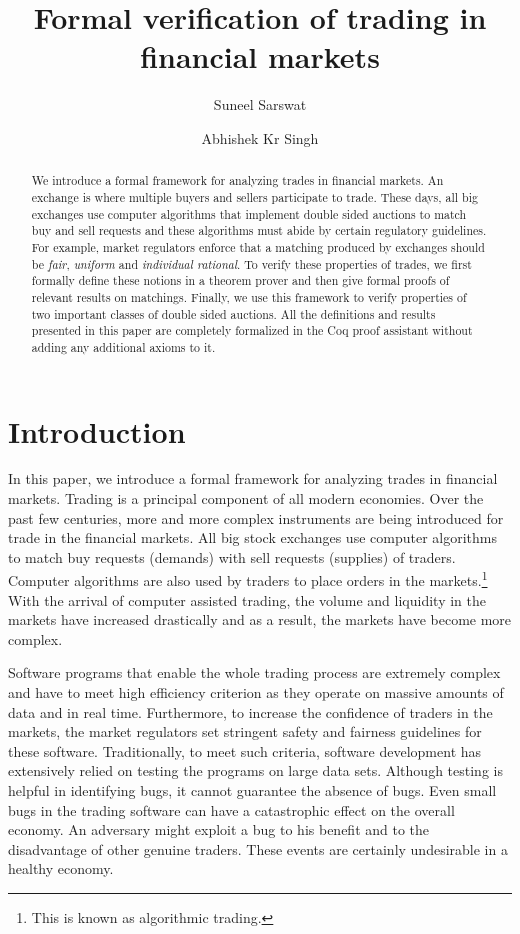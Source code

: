 \documentclass[a4paper,UKenglish,cleveref, autoref]{lipics-v2019}
\title{Formal verification of trading in financial markets} %
\author{Suneel Sarswat}{Tata Institute of Fundamental Research, India} {suneel.sarswat@gmail.com}
{}{}
\author{Abhishek Kr Singh}{Tata Institute of Fundamental Research, India} {abhishek.uor@gmail.com}
{}{}
\begin{document}
\newcommand{\tw}{\texttt}

\maketitle

\begin{abstract}


We introduce a formal framework for analyzing trades in financial markets. 
An exchange is where multiple buyers and sellers participate to trade.
These days, all big exchanges use computer algorithms that implement double sided auctions to match buy and sell requests and these algorithms must 
abide by certain regulatory guidelines.
For example, market regulators enforce that a matching produced by exchanges should 
be \emph{fair}, \emph{uniform} and \emph{individual rational}. 
To verify these properties of trades, we first formally define these notions
in a theorem prover and then give formal proofs of relevant results on matchings.
Finally, we use this framework to verify properties of two important classes of double
sided auctions. All the definitions and results presented in this paper are completely formalized in
the Coq proof assistant without adding any additional axioms to it. 


\end{abstract}

\section{Introduction}
\label{section1}

In this paper, we introduce a formal framework for analyzing trades in financial markets. Trading is a principal component of all modern economies. Over the past few centuries, more and more complex instruments are being introduced for trade in the financial markets. All big stock exchanges use computer algorithms to match buy requests (demands) with sell requests (supplies) of traders. Computer algorithms are also used by  traders to place orders in the markets.\footnote{This is known as algorithmic trading.} With the arrival of computer assisted trading, the volume and liquidity in the markets have increased drastically and as a result, the markets have become more complex.

Software programs that enable the whole trading process are extremely complex and have to meet high efficiency criterion as they operate on massive amounts of data and in real time. Furthermore, to increase the confidence of traders in the markets, the market regulators set stringent safety and fairness guidelines for these software. Traditionally, to meet such criteria, software development has extensively relied on testing the programs on large data sets. Although testing is helpful in identifying bugs, it cannot guarantee the absence of bugs. Even small bugs in the trading software can have a catastrophic effect on the overall economy. An adversary might exploit a bug to his benefit and to the disadvantage of other genuine traders. These events are certainly undesirable in a healthy economy. 
\end{document}
